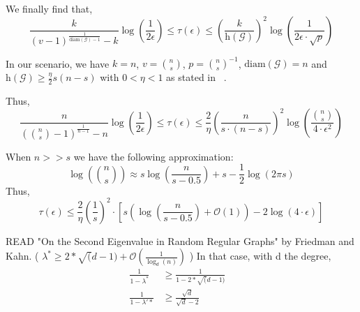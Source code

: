 \documentclass[conference]{IEEEtran}
\begin{document}
We finally find that,
$$\frac{k}{(v-1)^{\frac{1}{\text{diam}\left(\mathcal{G}\right)-1}}-k} \log\left(\frac{1}{2 \epsilon} \right)\leq \tau(\epsilon) \leq \left ( \frac{k}{\text{h}\left (\mathcal{G}\right)} \right )^2 \log \left( \frac{1}{2 \epsilon \cdot \sqrt{p}}\right) $$

In our scenario, we have $k= n$, $v={n \choose s}$, $p={n \choose s}^{-1}$, $\text{diam}\left(\mathcal{G}\right)=n$ and $\text{h}\left (\mathcal{G}\right)\geq\frac{\eta}{2}s(n-s)$ with $0<\eta<1$ as stated in ~\cite{bol88}.

Thus,
$$\frac{n}{({n \choose s}-1)^{\frac{1}{n-1}}-n} \log\left(\frac{1}{2 \epsilon} \right)\leq \tau(\epsilon) \leq \frac{2}{\eta} \left (\frac{n}{s\cdot(n-s)} \right )^2 \log \left( \frac{{n \choose s}}{4 \cdot \epsilon^2}\right) $$

When $n>>s$ we have the following approximation:
$$\log\left ({n \choose s} \right ) \approx s\log \left (\frac{n}{s-0.5}\right)+s-\frac{1}{2}\log \left(2 \pi s\right)$$
Thus,
$$\tau(\epsilon) \leq \frac{2}{\eta} \left (\frac{1}{s} \right )^2 \cdot \left [ s \left( \log \left (\frac{n}{s-0.5}\right) +\mathcal{O}\left(1\right) \right ) - 2\log \left( 4 \cdot \epsilon\right) \right ]$$


READ "On the Second Eigenvalue in Random Regular Graphs" by Friedman and Kahn. ( $\lambda^* \geq 2*\sqrt(d-1) + \mathcal{O}\left( \frac{1}{\log_d(n)} \right)$ )
In that case, with d the degree,
\begin{align}
\frac{1}{1-\lambda^*} &\geq \frac{1}{1-2*\sqrt(d-1)}& \\
\frac{1}{1-\lambda'*} &\geq \frac{\sqrt{d}}{\sqrt{d}-2}
\end{align}

\iffalse 
[01...] -> lazy walk on an hypercube : nlogn complexity with n being the number of bits.
However all combinations are not possible (there are at most s 0s) : (n choose s) != 2^n.
If path coupling used (first we choose a card label, then a position): $p(1) 1/n * (n-s)/n + p(0) 1/n s/n = 1/n [p(1) [(n-s)/n+1] + [1+p(0) s/n]] = alpha < 2/n$ very slow 
why ? car label is very detrimental but position is good (if b1 chosen, any p of 0s or p b1).

other shuffle:
oblibious merge: download s bits at a time (memory of 2s), permute 1s and 0s and upload to dbs.
\fi
\end{document}
